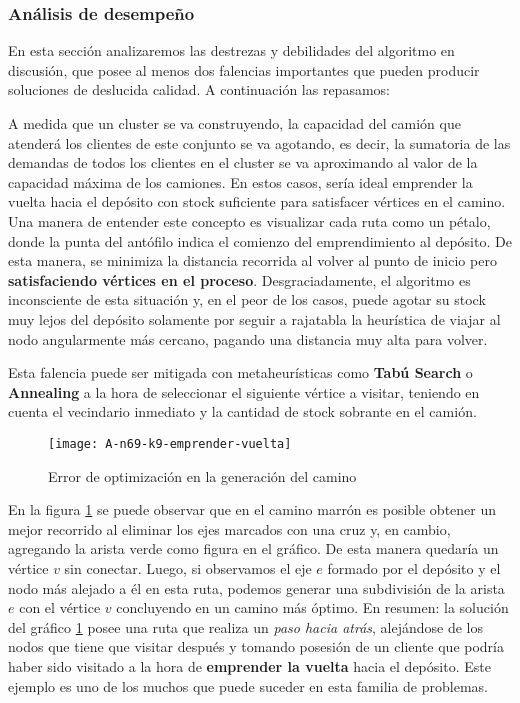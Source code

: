 \subsubsection{Análisis de desempeño}
En esta sección analizaremos las destrezas y debilidades del algoritmo en discusión, que posee al menos dos falencias importantes que pueden producir soluciones de deslucida calidad. A continuación las repasamos:

A medida que un cluster se va construyendo, la capacidad del camión que atenderá los clientes de este conjunto se va agotando, es decir, la sumatoria de las demandas de todos los clientes en el cluster se va aproximando al valor de la capacidad máxima de los camiones. En estos casos, sería ideal emprender la vuelta hacia el depósito con stock suficiente para satisfacer vértices en el camino. Una manera de entender este concepto es visualizar cada ruta como un pétalo, donde la punta del antófilo indica el comienzo del emprendimiento al depósito. De esta manera, se minimiza la distancia recorrida al volver al punto de inicio pero \textbf{satisfaciendo vértices en el proceso}. Desgraciadamente, el algoritmo es inconsciente de esta situación y, en el peor de los casos, puede agotar su stock muy lejos del depósito solamente por seguir a rajatabla la heurística de viajar al nodo angularmente más cercano, pagando una distancia muy alta para volver.

\vskip 8pt

Esta falencia puede ser mitigada con metaheurísticas como \textbf{Tabú Search} o \textbf{Annealing} a la hora de seleccionar el siguiente vértice a visitar, teniendo en cuenta el vecindario inmediato y la cantidad de stock sobrante en el camión.

\begin{figure}[H]
	\centering
	\texttt{[image: A-n69-k9-emprender-vuelta]}
	\caption{\footnotesize Error de optimización en la generación del camino}
	\label{fig:sweep-emprender-vuelta}
\end{figure}

En la figura \ref{fig:sweep-emprender-vuelta} se puede observar que en el camino marrón es posible obtener un mejor recorrido al eliminar los ejes marcados con una cruz y, en cambio, agregando la arista verde como figura en el gráfico. De esta manera quedaría un vértice $v$ sin conectar. Luego, si observamos el eje $e$ formado por el depósito y el nodo más alejado a él en esta ruta, podemos generar una subdivisión de la arista $e$ con el vértice $v$ concluyendo en un camino más óptimo. En resumen: la solución del gráfico \ref{fig:sweep-emprender-vuelta} posee una ruta que realiza un \textit{paso hacia atrás}, alejándose de los nodos que tiene que visitar después y tomando posesión de un cliente que podría haber sido visitado a la hora de \textbf{emprender la vuelta} hacia el depósito. Este ejemplo es uno de los muchos que puede suceder en esta familia de problemas.

